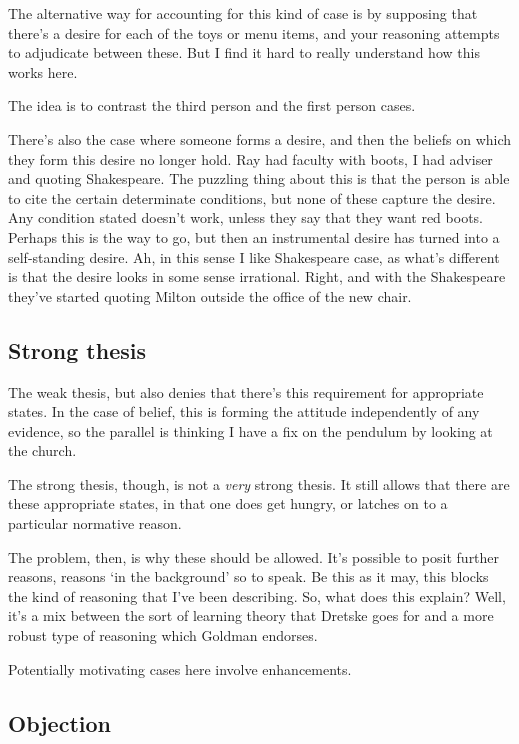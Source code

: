 \documentclass[10pt]{article}
\begin{document}
The alternative way for accounting for this kind of case is by supposing that there's a desire for each of the toys or menu items, and your reasoning attempts to adjudicate between these.
But I find it hard to really understand how this works here.

The idea is to contrast the third person and the first person cases.

There's also the case where someone forms a desire, and then the beliefs on which they form this desire no longer hold.
Ray had faculty with boots, I had adviser and quoting Shakespeare.
The puzzling thing about this is that the person is able to cite the certain determinate conditions, but none of these capture the desire.
Any condition stated doesn't work, unless they say that they want red boots.
Perhaps this is the way to go, but then an instrumental desire has turned into a self-standing desire.
Ah, in this sense I like Shakespeare case, as what's different is that the desire looks in some sense irrational.
Right, and with the Shakespeare they've started quoting Milton outside the office of the new chair.

\subsection{Strong thesis}
\label{sec:strong-thesis}


The weak thesis, but also denies that there's this requirement for appropriate states.
In the case of belief, this is forming the attitude independently of any evidence, so the parallel is thinking I have a fix on the pendulum by looking at the church.

The strong thesis, though, is not a \emph{very} strong thesis.
It still allows that there are these appropriate states, in that one does get hungry, or latches on to a particular normative reason.

The problem, then, is why these should be allowed.
It's possible to posit further reasons, reasons `in the background' so to speak.
Be this as it may, this blocks the kind of reasoning that I've been describing.
So, what does this explain?
Well, it's a mix between the sort of learning theory that Dretske goes for and a more robust type of reasoning which Goldman endorses.

Potentially motivating cases here involve enhancements.


\subsection{Objection}
\label{sec:objection}
\end{document}
